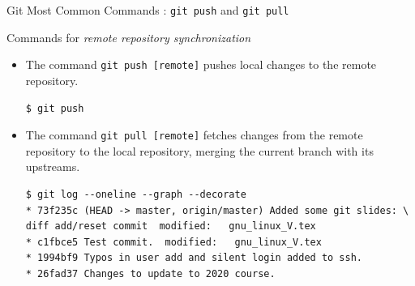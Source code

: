 \begin{frame}[t,fragile]{Git Most Common Commands : \alert{\texttt{git push}} and \alert{\texttt{git pull}}}
      \begin{block}{Commands for \emph{remote repository synchronization}}
        {\scriptsize
\begin{itemize}
  \item          The command  \alert{\texttt{git push [remote]}} pushes local changes to the remote repository.
          \begin{lstlisting}
$ git push

\end{lstlisting}
  \item  The command  \alert{\texttt{git pull [remote]}} fetches changes from the remote repository to the local repository, merging the current branch with its upstreams.

          \begin{lstlisting}
$ git log --oneline --graph --decorate
* 73f235c (HEAD -> master, origin/master) Added some git slides: \
diff add/reset commit  modified:   gnu_linux_V.tex
* c1fbce5 Test commit.  modified:   gnu_linux_V.tex
* 1994bf9 Typos in user add and silent login added to ssh.
* 26fad37 Changes to update to 2020 course.
\end{lstlisting}
\end{itemize}
}
\end{block}  
  
\end{frame}
